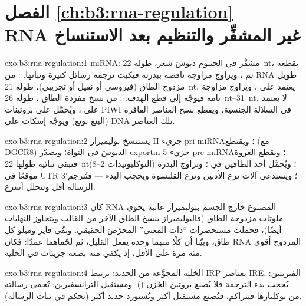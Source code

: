 \section*{الفصل \ref{ch:b3:rna-regulation} --- RNA غير المشفِّر والتنظيم بعد الاستنساخ}

\begin{solution}{exo:b3:rna-regulation:1}
miRNA: مشفَّر في الجينوم دبوسَ شعر، طوله \qty{22}{nt}، يقطعه 
ثم ، ويزاوج مزاوجة ناقصة ببذرته فيكبت ترجمة رسائل كثيرة
وثباتها. : من RNA طويل مزدوج الطاق (فيروسي أو نقيل أو تجريبي)،
طوله \qty{21}{nt}، يعتمد على ، ويزاوج مزاوجة تامة فيوجّه
 إلى قطع الهدف. : من نسخ مفردة الطاق ،
طوله \qtyrange{26}{31}{nt}، لا يعتمد على ، ويُحمَّل على بروتينات
PIWI في السلالة الجنسية، ويقطع نسخ العناصر القافزة (البنغ بونغ)
ويوجّه إسكات  على DNA تلك العناصر.
\end{solution}

\begin{solution}{exo:b3:rna-regulation:2}
يستنسخ بوليميراز II جزيء pri-miRNA؛ ويقتطع  (مع DGCR8) الدبوسَ
في النواة؛ ويصدّر exportin-5 جزيء pre-miRNA؛ ويقطع  العروة
فتبقى ثنائية طولها \qty{22}{nt}؛ ويُحمَّل أحد الطاقين في
؛ وتزاوج البذرة (النوكليوتيدات 2--8) موقعًا في UTR 3$'$؛
ويستدعي  آلات نزع الأدنين ونزع القلنسوة ويحجب البدء ---
فتُترجم الرسالة أقل وتتحلل أسرع.
\end{solution}

\begin{solution}{exo:b3:rna-regulation:3}
كان RNA المصنوع خارج الجسم ببوليميراز عاثية يحوي ملوثات مزدوجة الطاق
(فالبوليميراز ينسخ الطاق الآخر من القالب ويتجاوز النهايات أيضًا)،
فحملت مستحضرات ``ذات المعنى'' المحرّضَ الحقيقي. ونقّى فاير وميلو كل
طاق، وبيّنا أن كلًا منهما وحده يفعل القليل، ثم لحّماهما عمدًا: فكان
RNA المزدوج أقوى مئة مرة على الأقل، إذ يكفي منه بضعة جزيئات في
الخلية.
\end{solution}

\begin{solution}{exo:b3:rna-regulation:4}
الخلية المجوَّعة من الحديد: يرتبط IRP بعناصر IRE. الفيريتين: يُحجب
بدء الترجمة فلا يُصنع بروتين الخزن (). ومستقبل
الترانسفيرين: تُحمى رسالته من نوكليازها فتتراكم، فيُصنع مستقبل أكثر
ويُستورد حديد أكثر (تحكم في ثبات الرسالة).
\end{solution}

